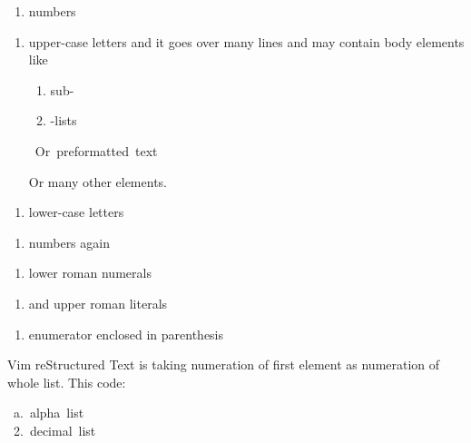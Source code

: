 \documentclass[12pt]{article}
\begin{document}
\begin{enumerate}[label=\arabic*.]
\item
numbers
\end{enumerate}
\begin{enumerate}[label=\Alph*.]
\item
upper-case letters
and it goes over many lines and may contain body elements like

 \begin{enumerate}[label=\arabic*.]
\item
sub-

\item
-lists
 \end{enumerate}

\begin{ttfamily}\begin{flushleft}
\mbox{~Or~preformatted~text}\\
\end{flushleft}\end{ttfamily}

 Or many other elements.
\end{enumerate}
\begin{enumerate}[label=\alph*.]
\item
lower-case letters
\end{enumerate}
\begin{enumerate}[label=\arabic*.]
\item
numbers again
\end{enumerate}
\begin{enumerate}[label=\roman*.]
\item
lower roman numerals
\end{enumerate}
\begin{enumerate}[label=\Roman*.]
\item
and upper roman literals
\end{enumerate}
\begin{enumerate}[label=\alph*.]
\item
enumerator enclosed in parenthesis
\end{enumerate}

Vim reStructured Text is taking numeration of first element as numeration of whole
list. This code:

\begin{ttfamily}\begin{flushleft}
\mbox{~a.~alpha~list}\\
\mbox{~2.~decimal~list}\\
\end{flushleft}\end{ttfamily}
\end{document}
